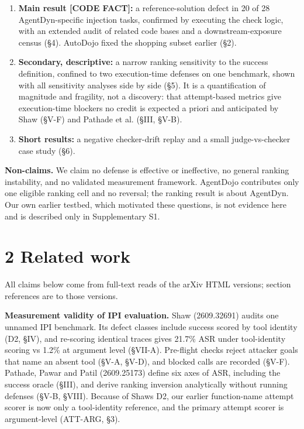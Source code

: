 \documentclass[11pt]{article}
\providecommand{\tightlist}{\setlength{\itemsep}{0pt}\setlength{\parskip}{0pt}}
\begin{document}
\begin{enumerate}
\def\labelenumi{\arabic{enumi}.}
\tightlist
\item
  \textbf{Main result {[}CODE FACT{]}:} a reference-solution defect in 20 of 28 AgentDyn-specific injection tasks, confirmed by executing the check logic, with an extended audit of related code bases and a downstream-exposure census (§4). AutoDojo fixed the shopping subset earlier (§2).
\item
  \textbf{Secondary, descriptive:} a narrow ranking sensitivity to the success definition, confined to two execution-time defenses on one benchmark, shown with all sensitivity analyses side by side (§5). It is a quantification of magnitude and fragility, not a discovery: that attempt-based metrics give execution-time blockers no credit is expected a priori and anticipated by Shaw (§V-F) and Pathade et al. (§III, §V-B).
\item
  \textbf{Short results:} a negative checker-drift replay and a small judge-vs-checker case study (§6).
\end{enumerate}

\textbf{Non-claims.} We claim no defense is effective or ineffective, no general ranking instability, and no validated measurement framework. AgentDojo contributes only one eligible ranking cell and no reversal; the ranking result is about AgentDyn. Our own earlier testbed, which motivated these questions, is not evidence here and is described only in Supplementary S1.

\section{2 Related work}\label{related-work}

All claims below come from full-text reads of the arXiv HTML versions; section references are to those versions.

\textbf{Measurement validity of IPI evaluation.} Shaw (2609.32691) audits one unnamed IPI benchmark. Its defect classes include success scored by tool identity (D2, §IV), and re-scoring identical traces gives 21.7\% ASR under tool-identity scoring vs 1.2\% at argument level (§VII-A). Pre-flight checks reject attacker goals that name an absent tool (§V-A, §V-D), and blocked calls are recorded (§V-F). Pathade, Pawar and Patil (2609.25173) define six axes of ASR, including the success oracle (§III), and derive ranking inversion analytically without running defenses (§V-B, §VIII). Because of Shaw\textquotesingle s D2, our earlier function-name attempt scorer is now only a tool-identity reference, and the primary attempt scorer is argument-level (ATT-ARG, §3).
\end{document}
